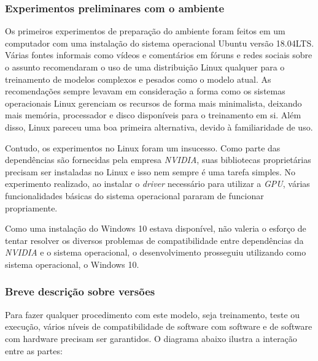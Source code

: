 \subsubsection{Experimentos preliminares com o ambiente}

Os primeiros experimentos de preparação do ambiente foram feitos em um computador com uma instalação do sistema operacional Ubuntu versão 18.04LTS. Várias fontes informais como vídeos e comentários em fóruns e redes sociais sobre o assunto recomendaram o uso de uma distribuição Linux qualquer para o treinamento de modelos complexos e pesados como o modelo atual. As recomendações sempre levavam em consideração a forma como os sistemas operacionais Linux gerenciam os recursos de forma mais minimalista, deixando mais memória, processador e disco disponíveis para o treinamento em si. Além disso, Linux pareceu uma boa primeira alternativa, devido à familiaridade de uso.

Contudo, os experimentos no Linux foram um insucesso. Como parte das dependências são fornecidas pela empresa \textit{NVIDIA}, suas bibliotecas proprietárias precisam ser instaladas no Linux e isso nem sempre é uma tarefa simples. No experimento realizado, ao instalar o \textit{driver} necessário para utilizar a \textit{GPU}, várias funcionalidades básicas do sistema operacional pararam de funcionar propriamente.

Como uma instalação do Windows 10 estava disponível, não valeria o esforço de tentar resolver os diversos problemas de compatibilidade entre dependências da \textit{NVIDIA} e o sistema operacional, o desenvolvimento prosseguiu utilizando como sistema operacional, o Windows 10.

\subsubsection{Breve descrição sobre versões}
\label{sec:environment-version-compatability}

Para fazer qualquer procedimento com este modelo, seja treinamento, teste ou execução, vários níveis de compatibilidade de software com software e de software com hardware precisam ser garantidos. O diagrama abaixo ilustra a interação entre as partes:

